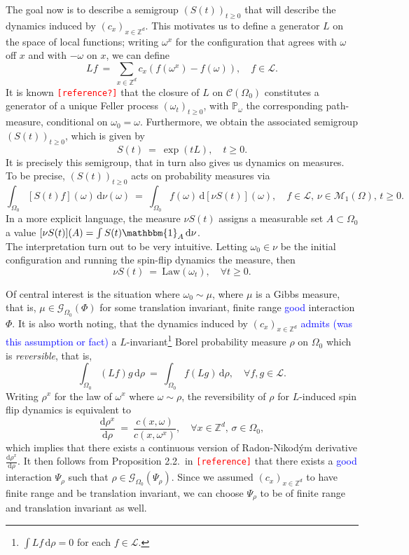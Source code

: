 \documentclass[12pt]{article}
\renewcommand{\d}{\mathrm{d}}
\newcommand{\G}{\mathcal{G}}
\newcommand{\Loc}{\mathcal{L}}
\newcommand{\M}{\mathcal{M}}
\renewcommand{\P}{\mathbb{P}}
\newcommand{\Z}{\mathbb{Z}}
\newcommand{\Law}{\mathrm{Law}}
\newcommand{\1}{\mathbbm{1}}
\newcommand{\5}{\vspace{0.5cm}}
\theoremstyle{definition}
\begin{document}
The goal now is to describe a semigroup $(S(t))_{t\geq 0}$ that will describe the dynamics induced by $(c_x)_{x\in\Z^d}$. This motivates us to define a generator $L$ on the space of local functions; writing $\omega^x$ for the configuration that agrees with $\omega$ off $x$ and with $-\omega$ on $x$, we can define
$$Lf ~=~ \sum_{x\in\Z^d}c_x(f(\omega^x)-f(\omega)), \quad f\in\Loc.$$ It is known \textcolor{red}{\texttt{[reference?]}} that the closure of $L$ on $\mathcal{C}(\Omega_0)$ constitutes a generator of a unique Feller process $(\omega_t)_{t\geq 0}$, with $\P_\omega$ the corresponding path-measure, conditional on $\omega_0=\omega$. Furthermore, we obtain the associated semigroup $(S(t))_{t\geq 0}$, which is given by
$$S(t) ~=~ \exp(tL), \quad t\geq 0.$$
It is precisely this semigroup, that in turn also gives us dynamics on measures. To be precise, $(S(t))_{t\geq 0}$ acts on probability measures via	
$$\int_{\Omega_0} [S(t)f](\omega)\,\d\nu(\omega) ~=~ \int_{\Omega_0}f(\omega)\,\d[\nu S(t)](\omega), \quad f\in\Loc,\,\nu\in\M_1(\Omega),\,t\geq 0.$$
In a more explicit language, the measure $\nu S(t)$ assigns a measurable set $A\subset\Omega_0$ a value $[\nu S(t)](A)=\int S(t)\1_A\,\d\nu$. \\

The interpretation turn out to be very intuitive. Letting $\omega_0\in\nu$ be the initial configuration and running the spin-flip dynamics the measure, then
$$\nu S(t) ~=~ \Law(\omega_t), \quad \forall t\geq 0.$$ 

Of central interest is the situation where $\omega_0\sim\mu$, where $\mu$ is a Gibbs measure, that is, $\mu\in\G_{\Omega_0}(\Phi)$ for some translation invariant, finite range \textcolor{blue}{good} interaction $\Phi$. It is also worth noting, that the dynamics induced by $(c_x)_{x\in\Z^d}$ \textcolor{blue}{admits (was this assumption or fact)} a $L$-invariant\footnote{$\int Lf\,\d\rho=0$ for each $f\in\Loc$.} Borel probability measure $\rho$ on $\Omega_0$ which is \textit{reversible}, that is,
$$\int_{\Omega_0}(Lf)g\,\d\rho ~=~ \int_{\Omega_0}f(Lg)\,\d\rho, \quad \forall f,g\in\Loc.$$
Writing $\rho^x$ for the law of $\omega^x$ where $\omega\sim\rho$, the reversibility of $\rho$ for $L$-induced spin flip dynamics is equivalent to
$$\frac{\d\rho^x}{\d\rho} ~=~ \frac{c(x,\omega)}{c(x,\omega^x)}, \quad \forall x\in\Z^d,\,\sigma\in\Omega_0,$$
which implies that there exists a continuous version of Radon-Nikod\'ym derivative $\frac{\d\rho^x}{\d\rho}$. It then follows from Proposition 2.2.~in \textcolor{red}{\texttt{[reference]}} that there exists a \textcolor{blue}{good} interaction $\Psi_\rho$ such that $\rho\in\G_{\Omega_0}(\Psi_\rho)$. Since we assumed $(c_{x})_{x\in\Z^d}$ to have finite range and be translation invariant, we can choose $\Psi_\rho$ to be of finite range and translation invariant as well.\\
\end{document}
